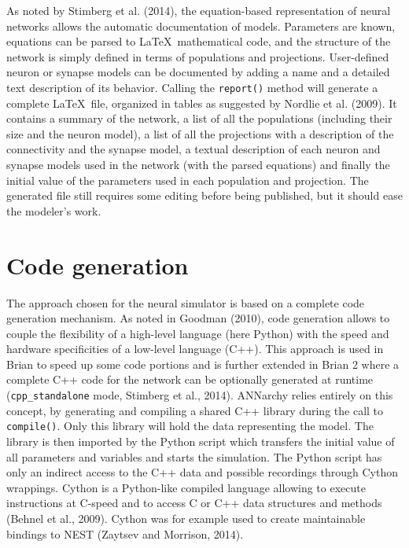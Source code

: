 \documentclass[
  11pt,
  a4paper,
]{scrbook}
\begin{document}
As noted by Stimberg et al. (2014), the equation-based representation of
neural networks allows the automatic documentation of models. Parameters
are known, equations can be parsed to \LaTeX~mathematical code, and the
structure of the network is simply defined in terms of populations and
projections. User-defined neuron or synapse models can be documented by
adding a name and a detailed text description of its behavior. Calling
the \texttt{report()} method will generate a complete \LaTeX~file,
organized in tables as suggested by Nordlie et al. (2009). It contains a
summary of the network, a list of all the populations (including their
size and the neuron model), a list of all the projections with a
description of the connectivity and the synapse model, a textual
description of each neuron and synapse models used in the network (with
the parsed equations) and finally the initial value of the parameters
used in each population and projection. The generated file still
requires some editing before being published, but it should ease the
modeler's work.

\section{Code generation}\label{code-generation}

The approach chosen for the neural simulator is based on a complete code
generation mechanism. As noted in Goodman (2010), code generation allows
to couple the flexibility of a high-level language (here Python) with
the speed and hardware specificities of a low-level language (C++). This
approach is used in Brian to speed up some code portions and is further
extended in Brian 2 where a complete C++ code for the network can be
optionally generated at runtime (\texttt{cpp\_standalone} mode, Stimberg
et al., 2014). ANNarchy relies entirely on this concept, by generating
and compiling a shared C++ library during the call to
\texttt{compile()}. Only this library will hold the data representing
the model. The library is then imported by the Python script which
transfers the initial value of all parameters and variables and starts
the simulation. The Python script has only an indirect access to the C++
data and possible recordings through Cython wrappings. Cython is a
Python-like compiled language allowing to execute instructions at
C-speed and to access C or C++ data structures and methods (Behnel et
al., 2009). Cython was for example used to create maintainable bindings
to NEST (Zaytsev and Morrison, 2014).
\end{document}
